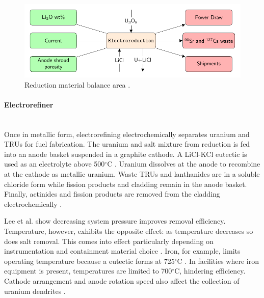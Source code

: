 \begin{figure}[h]
	\centering
	\includegraphics[width=0.9\linewidth]{images/reduction}
	\caption{Reduction material balance area \cite{lee_advanced_2008}.}
	\label{fig:reduction}
\end{figure}

\paragraph{Electrorefiner} \mbox{}\\
Once in metallic form, electrorefining electrochemically separates uranium and TRUs for fuel fabrication.
The uranium and salt mixture from reduction is fed into an anode basket suspended in a graphite cathode. 
A LiCl-KCl eutectic is used as an electrolyte above 500$^{\circ}$C \cite{flowsheet_1998,lee_korean_2011}. 
Uranium dissolves at the anode to recombine at the cathode as metallic uranium.
Waste TRUs and lanthanides are in a soluble chloride form  while fission products and cladding remain in the anode
basket. Finally, actinides and fission products are removed from the cladding electrochemically \cite{lee_korean_2011}.

Lee et al. \cite{lee_advanced_2008} show decreasing system pressure improves removal efficiency. 
Temperature, however, exhibits the opposite effect: as temperature decreases so does salt removal. This comes into effect 
particularly depending on instrumentation and containment material choice \cite{lee_advanced_2008}. 
Iron, for example, limits operating temperature because a eutectic forms at 725$^{\circ}$C \cite{chapman_revision_1984}.
In facilities where iron equipment is present, temperatures are limited to 700$^{\circ}$C, hindering efficiency. 
Cathode arrangement and anode rotation speed also affect the collection of uranium 
dendrites \cite{lee_advanced_2008}.

